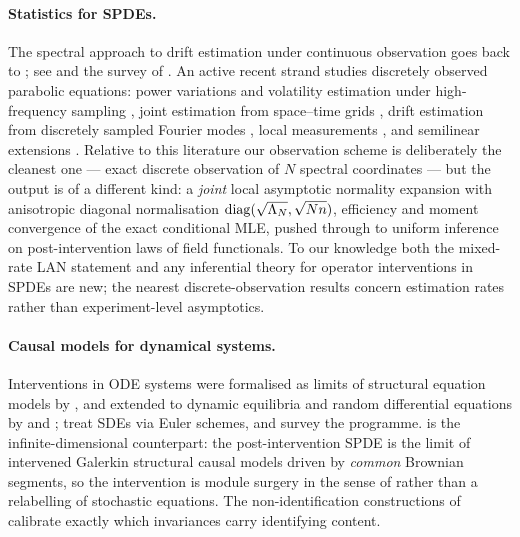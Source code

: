 \paragraph{Statistics for SPDEs.}
The spectral approach to drift estimation under continuous observation goes
back to \citet{HuebnerRozovskii1995}; see \citet{Lototsky2009} and the survey
of \citet{Cialenco2018}. An active recent strand studies discretely observed
parabolic equations: power variations and volatility estimation under
high-frequency sampling \citep{BibingerTrabs2020,Chong2020}, joint estimation
from space--time grids
\citep{HildebrandtTrabs2021,KainoUchida2021,TonakiKainoUchida2023,TonakiKainoUchida2024},
drift estimation from discretely sampled Fourier modes
\citep{CialencoDelgadoVencesKim2020}, local measurements
\citep{AltmeyerReiss2021}, and semilinear extensions
\citep{PasemannStannat2020}. Relative to this literature our observation
scheme is deliberately the cleanest one --- exact discrete observation of $N$
spectral coordinates --- but the output is of a different kind: a
\emph{joint} local asymptotic normality expansion with anisotropic diagonal
normalisation $\operatorname{diag}(\sqrt{\Lambda_N},\sqrt{Nn})$, efficiency and moment
convergence of the exact conditional MLE, pushed through to uniform
inference on post-intervention laws of field functionals. To our knowledge
both the mixed-rate LAN statement and any inferential theory for operator
interventions in SPDEs are new; the nearest discrete-observation results
concern estimation rates rather than experiment-level asymptotics.

\paragraph{Causal models for dynamical systems.}
Interventions in ODE systems were formalised as limits of structural
equation models by \citet{MooijJanzingScholkopf2013}, and extended to dynamic
equilibria and random differential equations by \citet{RubensteinEtAl2018}
and \citet{BongersMooij2018}; \citet{SokolHansen2014} treat SDEs via Euler
schemes, and \citet{PetersBauerPfister2022} survey the programme.
 is the infinite-dimensional counterpart: the
post-intervention SPDE is the limit of intervened Galerkin structural causal
models driven by \emph{common} Brownian segments, so the intervention is
module surgery in the sense of \citet{Haavelmo1944} rather than a
relabelling of stochastic equations. The non-identification constructions of
 calibrate exactly which invariances carry identifying
content.

